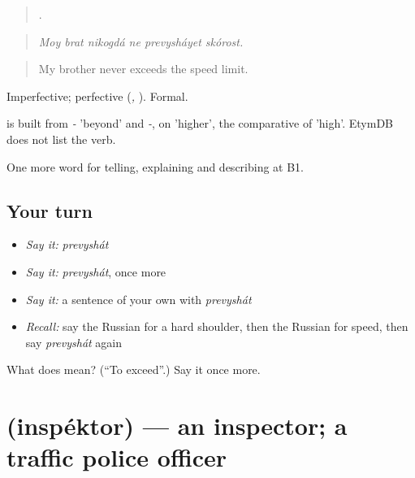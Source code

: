 \begin{quote}
     .
\end{quote}

\begin{quote}
\emph{Moy brat nikogdá ne prevysháyet skórost.}
\end{quote}

\begin{quote}
My brother never exceeds the speed limit.
\end{quote}

Imperfective; perfective \emph{} (\emph{, }). Formal.

\begin{cousinweb}
\emph{} is built from \emph{-} 'beyond' and \emph{-}, on \emph{} 'higher', the comparative of \emph{} 'high'. EtymDB does not list the verb.
\end{cousinweb}

\begin{grammarlens}[title={What you've built}]
One more word for telling, explaining and describing at B1.
\end{grammarlens}

\subsection*{Your turn}
\begin{itemize}
\raggedright
  \item \emph{Say it:} \emph{prevyshát}
  \item \emph{Say it:} \emph{prevyshát}, once more
  \item \emph{Say it:} a sentence of your own with \emph{prevyshát}
  \item \emph{Recall:} say the Russian for a hard shoulder, then the Russian for speed, then say \emph{prevyshát} again
\end{itemize}

\begin{tcolorbox}[breakable,colback=teal!4,colframe=teal!35!black,title={Before you move on}]
What does  mean? (\textquotedblleft{}To exceed\textquotedblright{}.) Say it once more.
\end{tcolorbox}
\section[\texorpdfstring{\ru{инспектор} (inspéktor)}{инспектор (inspéktor)}]{ (inspéktor) — an inspector; a traffic police officer}

